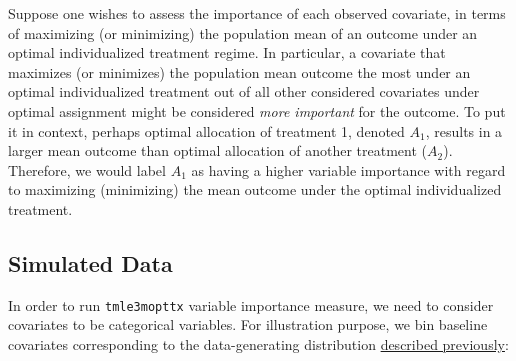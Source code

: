 \documentclass[12pt, krantz2,]{book}
\newenvironment{Shaded}{\begin{snugshade}}{\end{snugshade}}
\newcommand{\CommentTok}[1]{\textcolor[rgb]{0.56,0.35,0.01}{\textit{#1}}}
\newcommand{\DataTypeTok}[1]{\textcolor[rgb]{0.13,0.29,0.53}{#1}}
\newcommand{\DecValTok}[1]{\textcolor[rgb]{0.00,0.00,0.81}{#1}}
\newcommand{\KeywordTok}[1]{\textcolor[rgb]{0.13,0.29,0.53}{\textbf{#1}}}
\newcommand{\NormalTok}[1]{#1}
\newcommand{\OperatorTok}[1]{\textcolor[rgb]{0.81,0.36,0.00}{\textbf{#1}}}
\newcommand{\StringTok}[1]{\textcolor[rgb]{0.31,0.60,0.02}{#1}}
\theoremstyle{definition}
\theoremstyle{definition}
\theoremstyle{definition}
\newcommand{\1}{\mathbbm{1}}
\begin{document}
Suppose one wishes to assess the importance of each observed covariate, in
terms of maximizing (or minimizing) the population mean of an outcome under an
optimal individualized treatment regime. In particular, a covariate that
maximizes (or minimizes) the population mean outcome the most under an optimal
individualized treatment out of all other considered covariates under optimal
assignment might be considered \emph{more important} for the outcome. To put it in
context, perhaps optimal allocation of treatment 1, denoted \(A_1\), results in a
larger mean outcome than optimal allocation of another treatment (\(A_2\)).
Therefore, we would label \(A_1\) as having a higher variable importance with
regard to maximizing (minimizing) the mean outcome under the optimal
individualized treatment.

\hypertarget{simulated-data-2}{%
\subsection{Simulated Data}\label{simulated-data-2}}

In order to run \texttt{tmle3mopttx} variable importance measure, we need to consider
covariates to be categorical variables. For illustration purpose, we bin
baseline covariates corresponding to the data-generating distribution
\protect\hyperlink{oit-eval}{described previously}:

\begin{Shaded}
\end{Shaded}
\end{document}
